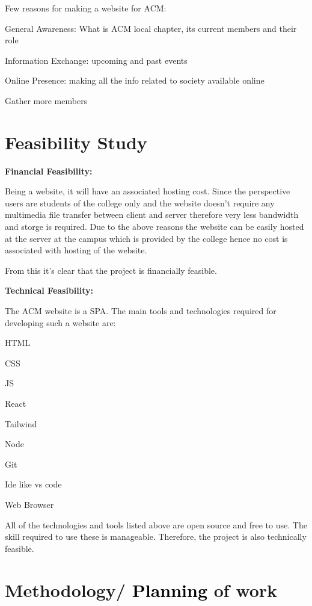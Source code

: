 \documentclass[english]{article}
\begin{document}
Few reasons for making a website for ACM:

\textbullet{} General Awareness: What is ACM local chapter, its current
members and their role

\textbullet{} Information Exchange: upcoming and past events

\textbullet{} Online Presence: making all the info related to society
available online

\textbullet{} Gather more members\newpage{}

\section{Feasibility Study }

\textbf{Financial Feasibility:}

Being a website, it will have an associated hosting cost. Since the
perspective users are students of the college only and the website
doesn\textquoteright t require any multimedia file transfer between
client and server therefore very less bandwidth and storge is required.
Due to the above reasons the website can be easily hosted at the server
at the campus which is provided by the college hence no cost is associated
with hosting of the website.

From this it\textquoteright s clear that the project is financially
feasible.

\noindent \textbf{Technical Feasibility:}

The ACM website is a SPA. The main tools and technologies required
for developing such a website are:

\textbullet{} HTML 

\textbullet{} CSS 

\textbullet{} JS 

\textbullet{} React 

\textbullet{} Tailwind 

\textbullet{} Node 

\textbullet{} Git 

\textbullet{} Ide like vs code 

\textbullet{} Web Browser 

All of the technologies and tools listed above are open source and
free to use. The skill required to use these is manageable. Therefore,
the project is also technically feasible. 

\newpage{}

\section{Methodology/ \textcolor{black}{Planning} of work }
\end{document}
